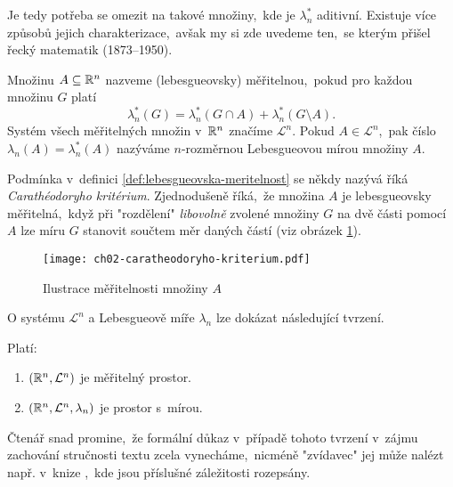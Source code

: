 Je tedy potřeba se omezit na takové množiny,~kde je $\lambda_n^*$ aditivní. Existuje více způsobů jejich charakterizace,~avšak my si zde uvedeme ten,~se kterým přišel řecký matematik  (1873--1950).
\begin{definition}\label{def:lebesgueovska-meritelnost}
    Množinu $A\subseteq\mathbb{R}^n$ nazveme (lebesgueovsky) měřitelnou,~pokud pro každou množinu $G$ platí
    \[\lambda_n^*(G)=\lambda_n^*(G\cap A)+\lambda_n^*(G\setminus A).\]
    Systém všech měřitelných množin v~$\mathbb{R}^n$ značíme $\mathcal{L}^n$.  Pokud $A\in\mathcal{L}^n$,~pak číslo $\lambda_n(A)=\lambda_n^*(A)$ nazýváme $n$-rozměrnou Lebesgueovou mírou množiny $A$.
\end{definition}
Podmínka v~definici \ref{def:lebesgueovska-meritelnost} se někdy nazývá říká \emph{Carathéodoryho kritérium}. Zjednodušeně říká,~že množina $A$ je lebesgueovsky měřitelná,~když při "rozdělení" \emph{libovolně} zvolené množiny $G$ na dvě části pomocí $A$ lze míru $G$ stanovit součtem měr daných částí (viz obrázek \ref{fig:caratheodoryho-kriterium}).
\begin{figure}[h]
    \centering
    \texttt{[image: ch02-caratheodoryho-kriterium.pdf]}
    \caption{Ilustrace měřitelnosti množiny $A$}
    \label{fig:caratheodoryho-kriterium}
\end{figure}
O systému $\mathcal{L}^n$ a Lebesgueově míře $\lambda_n$ lze dokázat následující tvrzení.
\begin{theorem}\label{thm:prostor-s-Lebesgueovou-mirou}
    Platí:
    \begin{enumerate}[label=(\roman*)]
        \item $(\mathbb{R}^n,\mathcal{L}^n)$ je měřitelný prostor.
        \item $(\mathbb{R}^n,\mathcal{L}^n,\lambda_n)$ je prostor s~mírou.
    \end{enumerate}
\end{theorem}
Čtenář snad promine,~že formální důkaz v~případě tohoto tvrzení v~zájmu zachování stručnosti textu zcela vynecháme,~nicméně "zvídavec" jej může nalézt např. v~knize \citep[str. 347]{Royden2010},~kde jsou příslušné záležitosti rozepsány.